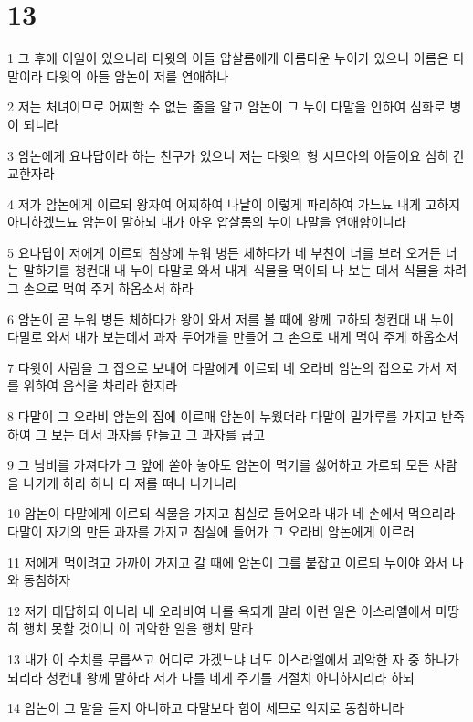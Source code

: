 \chapter{13}

\par 1 그 후에 이일이 있으니라 다윗의 아들 압살롬에게 아름다운 누이가 있으니 이름은 다말이라 다윗의 아들 암논이 저를 연애하나
\par 2 저는 처녀이므로 어찌할 수 없는 줄을 알고 암논이 그 누이 다말을 인하여 심화로 병이 되니라
\par 3 암논에게 요나답이라 하는 친구가 있으니 저는 다윗의 형 시므아의 아들이요 심히 간교한자라
\par 4 저가 암논에게 이르되 왕자여 어찌하여 나날이 이렇게 파리하여 가느뇨 내게 고하지 아니하겠느뇨 암논이 말하되 내가 아우 압살롬의 누이 다말을 연애함이니라
\par 5 요나답이 저에게 이르되 침상에 누워 병든 체하다가 네 부친이 너를 보러 오거든 너는 말하기를 청컨대 내 누이 다말로 와서 내게 식물을 먹이되 나 보는 데서 식물을 차려 그 손으로 먹여 주게 하옵소서 하라
\par 6 암논이 곧 누워 병든 체하다가 왕이 와서 저를 볼 때에 왕께 고하되 청컨대 내 누이 다말로 와서 내가 보는데서 과자 두어개를 만들어 그 손으로 내게 먹여 주게 하옵소서
\par 7 다윗이 사람을 그 집으로 보내어 다말에게 이르되 네 오라비 암논의 집으로 가서 저를 위하여 음식을 차리라 한지라
\par 8 다말이 그 오라비 암논의 집에 이르매 암논이 누웠더라 다말이 밀가루를 가지고 반죽하여 그 보는 데서 과자를 만들고 그 과자를 굽고
\par 9 그 남비를 가져다가 그 앞에 쏟아 놓아도 암논이 먹기를 싫어하고 가로되 모든 사람을 나가게 하라 하니 다 저를 떠나 나가니라
\par 10 암논이 다말에게 이르되 식물을 가지고 침실로 들어오라 내가 네 손에서 먹으리라 다말이 자기의 만든 과자를 가지고 침실에 들어가 그 오라비 암논에게 이르러
\par 11 저에게 먹이려고 가까이 가지고 갈 때에 암논이 그를 붙잡고 이르되 누이야 와서 나와 동침하자
\par 12 저가 대답하되 아니라 내 오라비여 나를 욕되게 말라 이런 일은 이스라엘에서 마땅히 행치 못할 것이니 이 괴악한 일을 행치 말라
\par 13 내가 이 수치를 무릅쓰고 어디로 가겠느냐 너도 이스라엘에서 괴악한 자 중 하나가 되리라 청컨대 왕께 말하라 저가 나를 네게 주기를 거절치 아니하시리라 하되
\par 14 암논이 그 말을 듣지 아니하고 다말보다 힘이 세므로 억지로 동침하니라
